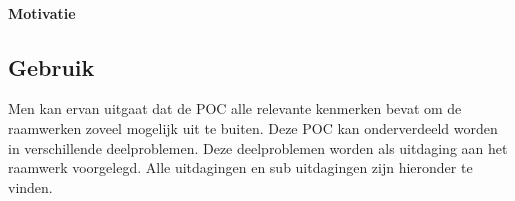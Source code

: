 \paragraph{Motivatie}


\subsection{Gebruik}
\label{sec:vergelijking-gebruik}

Men kan ervan uitgaat dat de POC alle relevante kenmerken bevat om de raamwerken zoveel mogelijk uit te buiten. 
Deze POC kan onderverdeeld worden in verschillende deelproblemen.
Deze deelproblemen worden als uitdaging aan het raamwerk voorgelegd.
Alle uitdagingen en sub uitdagingen zijn hieronder te vinden.

